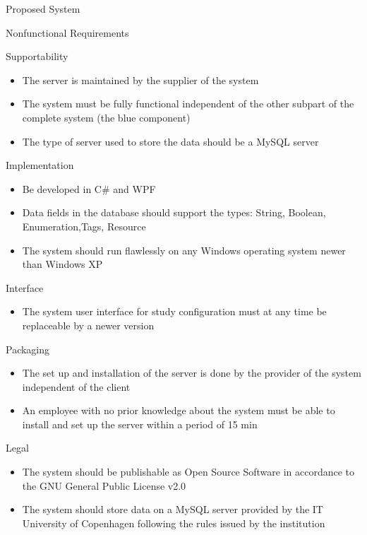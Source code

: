 \begin{section}{Proposed System}
\begin{subsection}{Nonfunctional Requirements}
\begin{subsubsection}{Supportability}
\begin{itemize}
\item The server is maintained by the supplier of the system
\item The system must be fully functional independent of the other subpart of the complete system (the blue component)
\item The type of server used to store the data should be a MySQL server
\end{itemize}
\end{subsubsection}

\begin{subsubsection}{Implementation}
\begin{itemize}
\item Be developed in C\# and WPF
\item Data fields in the database should support the types: String, Boolean, Enumeration,Tags, Resource
\item The system should run flawlessly on any Windows operating system newer than Windows XP
\end{itemize}
\end{subsubsection}

\begin{subsubsection}{Interface}
\begin{itemize}
\item The system user interface for study configuration must at any time be replaceable by a newer version
\end{itemize}
\end{subsubsection}

\begin{subsubsection}{Packaging}
\begin{itemize}
\item The set up and installation of the server is done by the provider of the system independent of the client
\item An employee with no prior knowledge about the system must be able to install and set up the server within a period of 15 min
\end{itemize}
\end{subsubsection}

\begin{subsubsection}{Legal}
\begin{itemize}
\item The system should be publishable as Open Source Software in accordance to the GNU General Public License v2.0
\item The system should store data on a MySQL server provided by the IT University of Copenhagen following the rules issued by the institution
\end{itemize}
\end{subsubsection}

\end{subsection}

\end{section}
